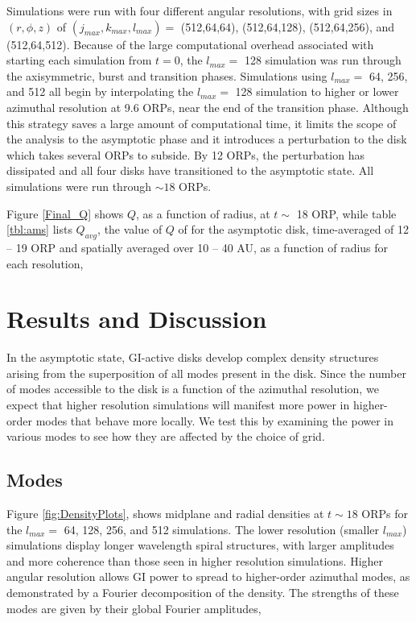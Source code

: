 \documentclass[manuscript]{aastex} %
\begin{document}
Simulations were run with four different angular resolutions, with grid sizes in $(r,\phi,z)$ of  $(j_{max}, k_{max}, l_{max}) =$ (512,64,64), (512,64,128), (512,64,256), and (512,64,512). Because of the large computational overhead associated with starting each simulation from $t = 0$, the $l_{max} =$ 128 simulation was run through the axisymmetric, burst and transition phases. Simulations using $l_{max} =$ 64, 256, and 512 all begin by interpolating the $l_{max} =$ 128 simulation to higher or lower azimuthal resolution at 9.6 ORPs, near the end of the transition
phase. Although this strategy saves a large amount of computational time, it limits the scope of the analysis to the asymptotic phase and it introduces a perturbation to the disk which takes several ORPs to subside. By 12 ORPs, the perturbation has dissipated and all four disks have transitioned to the asymptotic state.  All simulations were 
run through $\sim 18$ ORPs.

Figure \ref{Final_Q} shows $Q$, as a function of radius, at $t \sim$ 18 ORP, while table \ref{tbl:ams} lists $Q_{avg}$, the value of $Q$ of for the asymptotic disk, time-averaged of 12 -- 19 ORP and spatially averaged over 10 -- 40 AU, as a function of radius for each resolution,  


\section{Results and Discussion}
	
In the asymptotic state, GI-active disks develop complex density structures arising from the superposition of
all modes present in the disk.  Since the number of modes accessible to the disk is a function of the azimuthal resolution, we expect that higher resolution simulations will manifest more power in higher-order modes 
that behave more locally. We test this by examining the power in various modes to see how they are affected by the choice of grid.

\subsection{Modes}
	
Figure \ref{fig:DensityPlots}, shows midplane and radial densities  at $t \sim 18$ ORPs for the $l_{max} =$ 64, 128, 256, and 512 simulations. The lower resolution (smaller $l_{max}$) simulations display longer wavelength spiral structures, with larger amplitudes and more coherence than those seen in higher resolution simulations. Higher angular resolution allows GI power to spread to higher-order azimuthal modes, as demonstrated by a Fourier decomposition of the density. The strengths of these modes are given by their global Fourier amplitudes,
\end{document}
